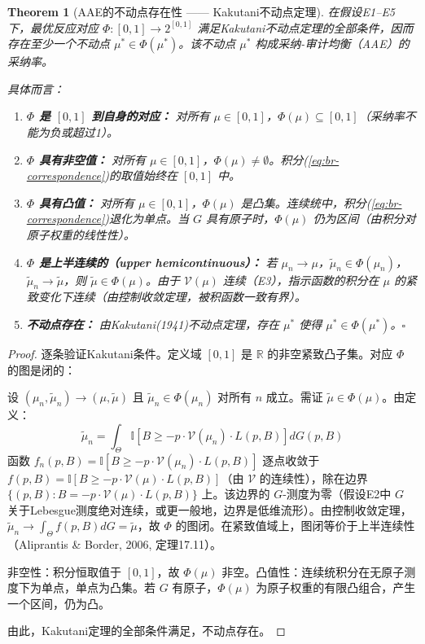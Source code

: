 \documentclass[12pt,a4paper]{ctexart}
\newtheorem{theorem}{Theorem}[section]
\theoremstyle{definition}
\theoremstyle{remark}
\begin{document}
\begin{theorem}[AAE的不动点存在性 —— Kakutani不动点定理]
\label{thm:aae-fixed-point}
在假设E1--E5下，最优反应对应 $\Phi: [0,1] \to 2^{[0,1]}$ 满足Kakutani不动点定理的全部条件，因而存在至少一个不动点 $\mu^* \in \Phi(\mu^*)$。该不动点 $\mu^*$ 构成采纳-审计均衡（AAE）的采纳率。

具体而言：
\begin{enumerate}[label=(\roman*), itemsep=6pt]
\item \textbf{$\Phi$ 是 $[0,1]$ 到自身的对应：} 对所有 $\mu \in [0,1]$，$\Phi(\mu) \subseteq [0,1]$（采纳率不能为负或超过1）。

\item \textbf{$\Phi$ 具有非空值：} 对所有 $\mu \in [0,1]$，$\Phi(\mu) \neq \emptyset$。\hfill\textit{积分(\ref{eq:br-correspondence})的取值始终在 $[0,1]$ 中。}

\item \textbf{$\Phi$ 具有凸值：} 对所有 $\mu \in [0,1]$，$\Phi(\mu)$ 是凸集。\hfill\textit{连续统中，积分(\ref{eq:br-correspondence})退化为单点。当 $G$ 具有原子时，$\Phi(\mu)$ 仍为区间（由积分对原子权重的线性性）。}

\item \textbf{$\Phi$ 是上半连续的（upper hemicontinuous）：} 若 $\mu_n \to \mu$，$\tilde{\mu}_n \in \Phi(\mu_n)$，$\tilde{\mu}_n \to \tilde{\mu}$，则 $\tilde{\mu} \in \Phi(\mu)$。\hfill\textit{由于 $\mathcal{V}(\mu)$ 连续（E3），指示函数的积分在 $\mu$ 的紧致变化下连续（由控制收敛定理，被积函数一致有界）。}

\item \textbf{不动点存在：} 由Kakutani(1941)不动点定理，存在 $\mu^*$ 使得 $\mu^* \in \Phi(\mu^*)$。\hfill$\square$
\end{enumerate}
\end{theorem}

\begin{proof}
逐条验证Kakutani条件。定义域 $[0,1]$ 是 $\mathbb{R}$ 的非空紧致凸子集。对应 $\Phi$ 的图是闭的：

设 $(\mu_n, \tilde{\mu}_n) \to (\mu, \tilde{\mu})$ 且 $\tilde{\mu}_n \in \Phi(\mu_n)$ 对所有 $n$ 成立。需证 $\tilde{\mu} \in \Phi(\mu)$。由定义：
\begin{equation}
\tilde{\mu}_n = \int_{\Theta} \mathbb{I}\left[B \geq -p \cdot \mathcal{V}(\mu_n) \cdot L(p, B)\right] dG(p, B)
\end{equation}
函数 $f_n(p, B) = \mathbb{I}[B \geq -p \cdot \mathcal{V}(\mu_n) \cdot L(p, B)]$ 逐点收敛于 $f(p, B) = \mathbb{I}[B \geq -p \cdot \mathcal{V}(\mu) \cdot L(p, B)]$（由 $\mathcal{V}$ 的连续性），除在边界 $\{(p, B) : B = -p \cdot \mathcal{V}(\mu) \cdot L(p, B)\}$ 上。该边界的 $G$-测度为零（假设E2中 $G$ 关于Lebesgue测度绝对连续，或更一般地，边界是低维流形）。由控制收敛定理，$\tilde{\mu}_n \to \int_{\Theta} f(p, B) dG = \tilde{\mu}$，故 $\Phi$ 的图闭。在紧致值域上，图闭等价于上半连续性（Aliprantis \& Border, 2006, 定理17.11）。

非空性：积分恒取值于 $[0,1]$，故 $\Phi(\mu)$ 非空。凸值性：连续统积分在无原子测度下为单点，单点为凸集。若 $G$ 有原子，$\Phi(\mu)$ 为原子权重的有限凸组合，产生一个区间，仍为凸。

由此，Kakutani定理的全部条件满足，不动点存在。
\end{proof}
\end{document}
